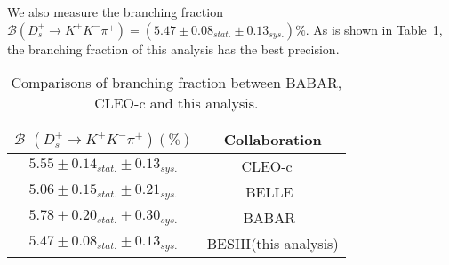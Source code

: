 {   
    
    We also measure the branching fraction $\mathcal{B}(D_{s}^{+} \rightarrow K^{+}K^{-}\pi^{+})=(5.47\pm0.08_{stat.}\pm0.13_{sys.})\%$.
    As is shown in Table~\ref{BF-Compare}, the branching fraction of this analysis has the best precision.
    \begin{table}[htbp]
        \caption{Comparisons of branching fraction between BABAR, CLEO-c and this analysis.}
        \label{BF-Compare}
        \begin{center}
            \begin{tabular}{cc}
                \toprule\toprule
                $\mathcal{B}$ $(D_{s}^{+} \rightarrow K^{+}K^{-}\pi^{+})(\%)$ & Collaboration  \\
                \hline
                $5.55\pm0.14_{stat.}\pm0.13_{sys.}$    &  CLEO-c ~\cite{CLEO-BF}                     \\
                $5.06\pm0.15_{stat.}\pm0.21_{sys.}$    &  BELLE~\cite{BELL-BF}                     \\
                $5.78\pm0.20_{stat.}\pm0.30_{sys.}$    &  BABAR~\cite{BABAR-BF}                    \\
                $5.47\pm0.08_{stat.}\pm0.13_{sys.}$                     &  BESIII(this analysis)    \\
                \bottomrule\bottomrule
            \end{tabular}
        \end{center}
    \end{table}
    
}
